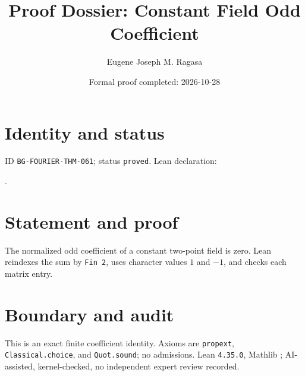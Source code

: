 \documentclass[11pt]{article}
\title{Proof Dossier: Constant Field Odd Coefficient}\author{Eugene Joseph M. Ragasa}\date{Formal proof completed: 2026-10-28}
\begin{document}
\raggedright\maketitle
\section{Identity and status}
ID \texttt{BG-FOURIER-THM-061}; status \texttt{proved}. Lean declaration:
\par{}.
\section{Statement and proof}
The normalized odd coefficient of a constant two-point field is zero. Lean reindexes the sum by \texttt{Fin 2}, uses character values $1$ and $-1$, and checks each matrix entry.
\section{Boundary and audit}
This is an exact finite coefficient identity. Axioms are \texttt{propext}, \texttt{Classical.choice}, and \texttt{Quot.sound}; no admissions. Lean \texttt{4.35.0}, Mathlib {\scriptsize{}}; AI-assisted, kernel-checked, no independent expert review recorded.
\end{document}
